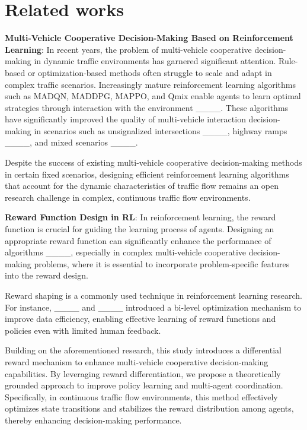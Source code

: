 \section{Related works}
\textbf{Multi-Vehicle Cooperative Decision-Making Based on Reinforcement Learning}:
In recent years, the problem of multi-vehicle cooperative decision-making in dynamic traffic environments has garnered significant attention. Rule-based or optimization-based methods often struggle to scale and adapt in complex traffic scenarios. Increasingly mature reinforcement learning algorithms such as MADQN, MADDPG, MAPPO, and Qmix enable agents to learn optimal strategies through interaction with the environment ____. These algorithms have significantly improved the quality of multi-vehicle interaction decision-making in scenarios such as unsignalized intersections ____, highway ramps ____, and mixed scenarios ____.

Despite the success of existing multi-vehicle cooperative decision-making methods in certain fixed scenarios, designing efficient reinforcement learning algorithms that account for the dynamic characteristics of traffic flow remains an open research challenge in complex, continuous traffic flow environments.

\textbf{Reward Function Design in RL}:
In reinforcement learning, the reward function is crucial for guiding the learning process of agents. Designing an appropriate reward function can significantly enhance the performance of algorithms ____, especially in complex multi-vehicle cooperative decision-making problems, where it is essential to incorporate problem-specific features into the reward design.

Reward shaping is a commonly used technique in reinforcement learning research. For instance, ____ and ____ introduced a bi-level optimization mechanism to improve data efficiency, enabling effective learning of reward functions and policies even with limited human feedback.

Building on the aforementioned research, this study introduces a differential reward mechanism to enhance multi-vehicle cooperative decision-making capabilities. By leveraging reward differentiation, we propose a theoretically grounded approach to improve policy learning and multi-agent coordination. Specifically, in continuous traffic flow environments, this method effectively optimizes state transitions and stabilizes the reward distribution among agents, thereby enhancing decision-making performance.